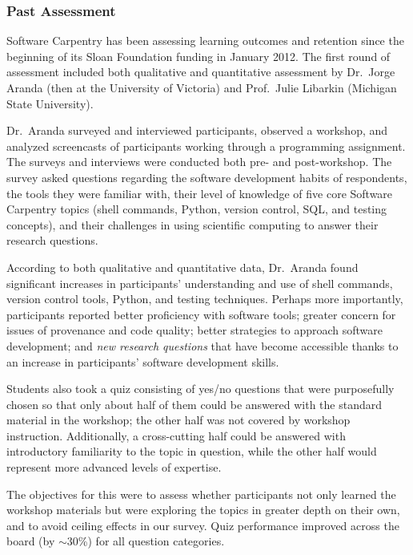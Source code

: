 \documentclass{proposalnsf}
\begin{document}
\subsubsection{Past Assessment}
\label{sec:pastAssessment}

Software Carpentry has been assessing learning outcomes and retention
since the beginning of its Sloan Foundation funding in January 2012.
The first round of assessment included both qualitative and
quantitative assessment by Dr.\ Jorge Aranda (then at the University
of Victoria) and Prof.\ Julie Libarkin (Michigan State University).

Dr.\ Aranda surveyed and interviewed participants, observed a
workshop, and analyzed screencasts of participants working through a
programming assignment. The surveys and interviews were conducted both
pre- and post-workshop. The survey asked questions regarding the
software development habits of respondents, the tools they were
familiar with, their level of knowledge of five core Software
Carpentry topics (shell commands, Python, version control, SQL, and
testing concepts), and their challenges in using scientific computing
to answer their research questions.

According to both qualitative and quantitative data, Dr.\ Aranda found
significant increases in participants' understanding and use of shell
commands, version control tools, Python, and testing
techniques. Perhaps more importantly, participants reported better
proficiency with software tools; greater concern for issues of
provenance and code quality; better strategies to approach software
development; and \emph{new research questions} that have become
accessible thanks to an increase in participants' software development
skills.

Students also took a quiz consisting of yes/no questions that were
purposefully chosen so that only about half of them could be answered
with the standard material in the workshop; the other half was not
covered by workshop instruction. Additionally, a cross-cutting half
could be answered with introductory familiarity to the topic in
question, while the other half would represent more advanced levels of
expertise.

The objectives for this were to assess whether participants not only
learned the workshop materials but were exploring the topics in
greater depth on their own, and to avoid ceiling effects in our
survey. Quiz performance improved across the board (by $\sim$30\%) for
all question categories.
\end{document}
